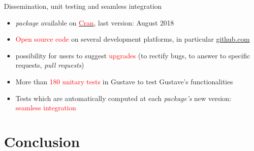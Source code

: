 \documentclass[xcolor=dvipsnames]{beamer}
\begin{document}
\begin{frame}{Dissemination, unit testing and seamless integration}

\begin{itemize}
    \item \textit{package} available on \underline{\href{https://cran.r-project.org/web/packages/gustave/index.html}{\textcolor{red}{Cran}}}, last version: August 2018
    \vspace{0.5 cm}
    
    \item \textcolor{red}{Open source code} on several development platforms, in particular \underline{\href{https://github.com/martinchevalier/gustave}{github.com}}

    \vspace{0.5 cm}

    \item possibility for users to suggest \textcolor{red}{upgrades} (to rectify bugs, to answer to specific requests, \textit{pull requests})

    \vspace{0.5 cm}
    
    \item More than \textcolor{red}{180 unitary tests} in Gustave to test Gustave's functionalities
  
    \vspace{0.5 cm}

    \item Tests which are automatically computed at each \textit{package's} new version: \textcolor{red}{seamless integration}
\end{itemize}
    
\end{frame}


\section*{Conclusion}
\end{document}
